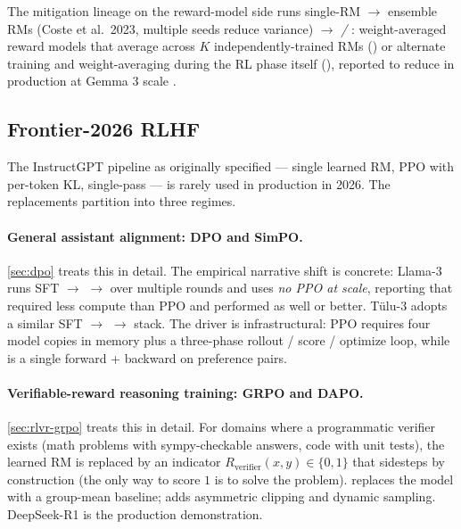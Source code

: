 The mitigation lineage on the reward-model side runs
single-RM \citep{ouyang2022-instructgpt} $\to$ ensemble RMs (Coste et
al.\ 2023, multiple seeds reduce variance) $\to$ \emph{ /
} \citep{warm-2024,warp-2024}: weight-averaged reward models that
average  across $K$ independently-trained RMs () or
alternate training and weight-averaging during the RL phase itself
(), reported to reduce  in production at Gemma 3
scale \citep{gemma3}.

\subsection{Frontier-2026 RLHF}
\label{sec:rlhf-frontier}

The InstructGPT pipeline as originally specified — single learned
RM, PPO with per-token KL, single-pass — is rarely used in production
in 2026. The replacements partition into three regimes.

\paragraph{General assistant alignment: DPO and SimPO.} \cref{sec:dpo}
treats this in detail. The empirical narrative shift is concrete:
Llama-3 \citep{meta-llama3} runs SFT $\to$ 
$\to$  over multiple rounds and uses \emph{no PPO at scale},
reporting that  required less compute than PPO and performed as
well or better. T\"ulu-3 \citep{tulu3} adopts a similar SFT $\to$
 $\to$  stack. The driver is infrastructural: PPO requires
four model copies in memory plus a three-phase rollout / score /
optimize loop, while  is a single forward + backward on
preference pairs.

\paragraph{Verifiable-reward reasoning training: GRPO and DAPO.}
\cref{sec:rlvr-grpo} treats this in detail. For domains where a
programmatic verifier exists (math problems with sympy-checkable
answers, code with unit tests), the learned RM is replaced by an
indicator $R_{\mathrm{verifier}}(x, y) \in \{0, 1\}$ that sidesteps
 by construction (the only way to score $1$ is to solve
the problem).  \citep{shao2024} replaces the  model with a
group-mean baseline;  \citep{dapo2025} adds asymmetric clipping
and dynamic sampling. DeepSeek-R1 \citep{deepseek-r1} is the
production demonstration.

